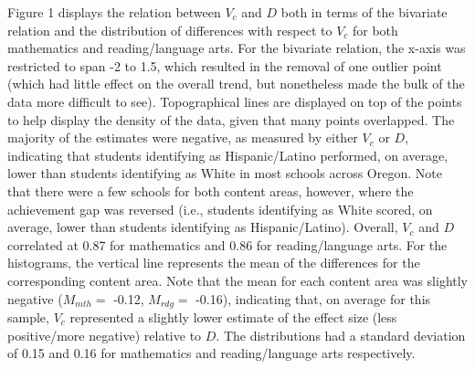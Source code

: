 \documentclass[man, fleqn, noextraspace]{apa6}
\theoremstyle{definition}
\theoremstyle{definition}
\theoremstyle{definition}
\theoremstyle{remark}
\begin{document}
Figure 1 displays the relation between \(V_c\) and \(D\) both in terms
of the bivariate relation and the distribution of differences with
respect to \(V_c\) for both mathematics and reading/language arts. For
the bivariate relation, the x-axis was restricted to span -2 to 1.5,
which resulted in the removal of one outlier point (which had little
effect on the overall trend, but nonetheless made the bulk of the data
more difficult to see). Topographical lines are displayed on top of the
points to help display the density of the data, given that many points
overlapped. The majority of the estimates were negative, as measured by
either \(V_c\) or \(D\), indicating that students identifying as
Hispanic/Latino performed, on average, lower than students identifying
as White in most schools across Oregon. Note that there were a few
schools for both content areas, however, where the achievement gap was
reversed (i.e., students identifying as White scored, on average, lower
than students identifying as Hispanic/Latino). Overall, \(V_c\) and
\(D\) correlated at 0.87 for mathematics and 0.86 for reading/language
arts. For the histograms, the vertical line represents the mean of the
differences for the corresponding content area. Note that the mean for
each content area was slightly negative (\(M_{mth} =\) -0.12,
\(M_{rdg} =\) -0.16), indicating that, on average for this sample,
\(V_c\) represented a slightly lower estimate of the effect size (less
positive/more negative) relative to \(D\). The distributions had a
standard deviation of 0.15 and 0.16 for mathematics and reading/language
arts respectively.
\end{document}
